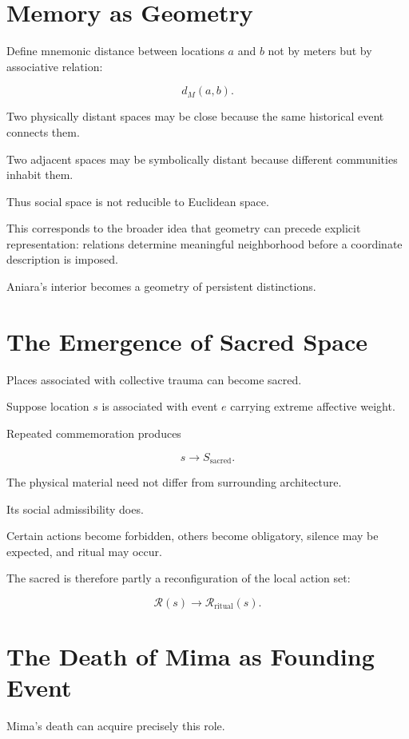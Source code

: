 \documentclass[11pt,oneside]{book}
\theoremstyle{definition}
\theoremstyle{remark}
\newcommand{\R}{\mathcal{R}}
\begin{document}
\section{Memory as Geometry}

Define mnemonic distance between locations \(a\) and \(b\) not by meters but by associative relation:

\[
d_M(a,b).
\]

Two physically distant spaces may be close because the same historical event connects them.

Two adjacent spaces may be symbolically distant because different communities inhabit them.

Thus social space is not reducible to Euclidean space.

This corresponds to the broader idea that geometry can precede explicit representation: relations determine meaningful neighborhood before a coordinate description is imposed.

Aniara's interior becomes a geometry of persistent distinctions.

\section{The Emergence of Sacred Space}

Places associated with collective trauma can become sacred.

Suppose location \(s\) is associated with event \(e\) carrying extreme affective weight.

Repeated commemoration produces

\[
s
\rightarrow
S_{\mathrm{sacred}}.
\]

The physical material need not differ from surrounding architecture.

Its social admissibility does.

Certain actions become forbidden, others become obligatory, silence may be expected, and ritual may occur.

The sacred is therefore partly a reconfiguration of the local action set:

\[
\R(s)
\rightarrow
\R_{\mathrm{ritual}}(s).
\]

\section{The Death of Mima as Founding Event}

Mima's death can acquire precisely this role.
\end{document}

